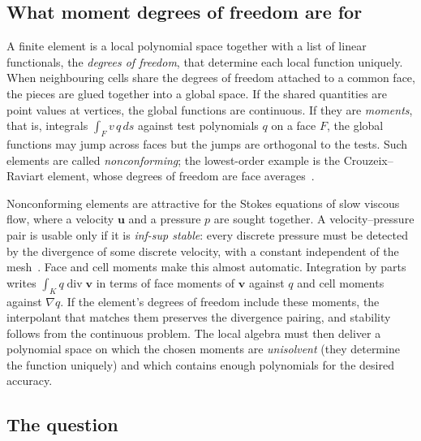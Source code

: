 \documentclass[11pt,a4paper]{article}
\theoremstyle{definition}
\theoremstyle{remark}
\begin{document}
\subsection{What moment degrees of freedom are for}

A finite element is a local polynomial space together with a list of
linear functionals, the \emph{degrees of freedom}, that determine each
local function uniquely. When neighbouring cells share the degrees of
freedom attached to a common face, the pieces are glued together into a
global space. If the shared quantities are point values at vertices,
the global functions are continuous. If they are \emph{moments}, that
is, integrals \(\int_F v\,q\,ds\) against test polynomials \(q\) on a face
\(F\), the global functions may jump across faces but the jumps are
orthogonal to the tests. Such elements are called \emph{nonconforming};
the lowest-order example is the Crouzeix--Raviart element, whose degrees
of freedom are face averages~\cite{CR1973}.

Nonconforming elements are attractive for the Stokes equations of slow
viscous flow, where a velocity \(\mathbf u\) and a pressure \(p\) are
sought together. A velocity--pressure pair is usable only if it is
\emph{inf-sup stable}: every discrete pressure must be detected by the
divergence of some discrete velocity, with a constant independent of
the mesh~\cite{BBF2013}. Face and cell moments make this almost
automatic. Integration by parts writes \(\int_K q\operatorname{div}\mathbf
v\) in terms of face moments of \(\mathbf v\) against \(q\) and cell
moments against \(\nabla q\). If the element's degrees of freedom include
these moments, the interpolant that matches them preserves the
divergence pairing, and stability follows from the continuous problem.
The local algebra must then deliver a polynomial space on which the
chosen moments are \emph{unisolvent} (they determine the function
uniquely) and which contains enough polynomials for the desired
accuracy.

\subsection{The question}
\end{document}
